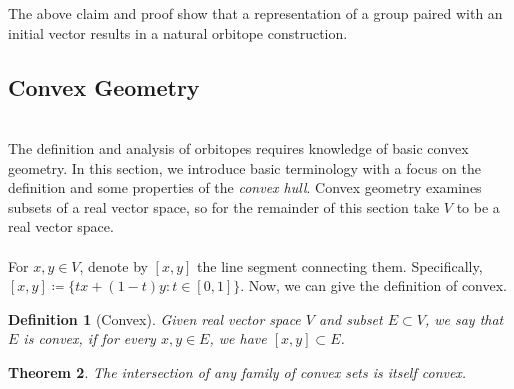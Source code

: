 \documentclass[12]{amsart}
\newtheorem{theorem}{Theorem}[section]
\newtheorem{definition}[theorem]{Definition}
\newcommand{\seg}[2]{[#1,#2]}
\begin{document}
	The above claim and proof show that a representation of a group paired with an initial vector results in a natural orbitope construction.
~\\\subsection{Convex Geometry}~\\
The definition and analysis of orbitopes requires knowledge of basic convex geometry. In this section, we introduce basic terminology with a focus on the definition and some properties of the \emph{convex hull}. Convex geometry examines subsets of a real vector space, so for the remainder of this section take $V$ to be a real vector space.
\\\\
For $x,y \in V$, denote by $\seg{x}{y}$ the line segment connecting them. Specifically,  $\seg{x}{y} \coloneqq \{ tx + (1-t)y : t \in [0,1] \}$. Now, we can give the definition of convex.
\begin{definition}[Convex]
Given real vector space $V$ and subset $E \subset V$, we say that $E$ is \emph{convex}, if for every $x,y \in E$, we have $\seg{x}{y} \subset E$.
\end{definition}

\begin{theorem}
    The intersection of any family of convex sets is itself convex.
\end{theorem}
\end{document}

